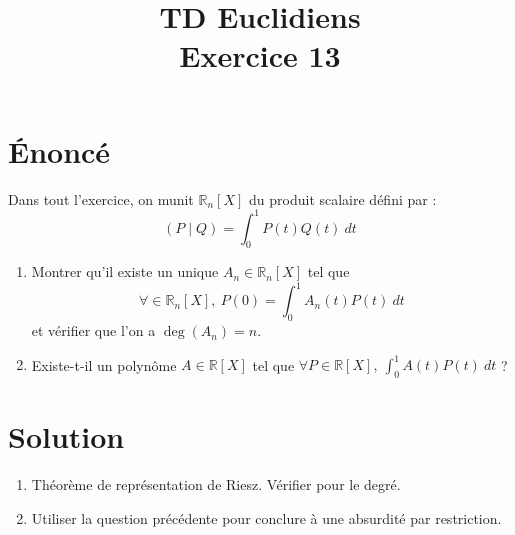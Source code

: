 \documentclass[french]{article}
\title{TD Euclidiens\\ Exercice 13}
\date{}
\newcommand{\R}{\mathbb{R}}
\begin{document}
\maketitle

\section{Énoncé}
Dans tout l'exercice, on munit $\R_n[X]$ du produit scalaire défini par : $$(P\mid Q)=\int_{0}^{1}P(t)Q(t)\ dt$$
\begin{enumerate}
	\item Montrer qu'il existe un unique $A_n\in\R_n[X]$ tel que $$\forall \in\R_n[X],\ P(0)=\int_{0}^{1}A_n(t)P(t)\ dt$$ et vérifier que l'on a $\deg(A_n)=n$.
	\item Existe-t-il un polynôme $A\in\R[X]$ tel que $\forall P\in\R[X],\ \displaystyle\int_{0}^{1}A(t)P(t)\ dt$ ?
\end{enumerate}
\section{Solution}
\begin{enumerate}
	\item Théorème de représentation de Riesz. Vérifier pour le degré.
	\item Utiliser la question précédente pour conclure à une absurdité par restriction.
\end{enumerate}
\end{document}
